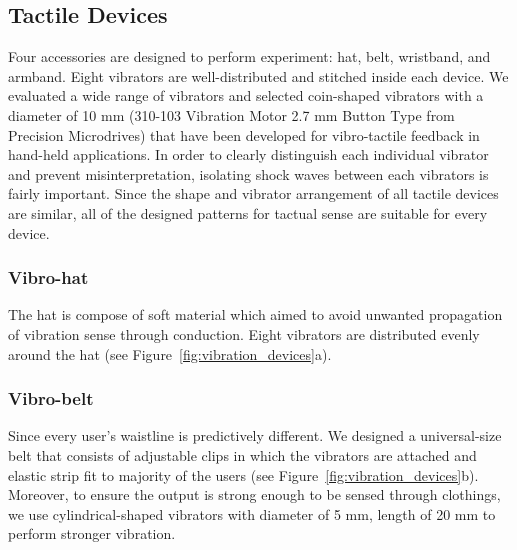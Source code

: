 \documentclass{sigchi}
\begin{document}
\subsection{Tactile Devices}
Four accessories are designed to perform experiment: hat, belt, wristband, and armband. Eight vibrators are well-distributed and stitched inside each device. We evaluated a wide range of vibrators and selected coin-shaped vibrators with a diameter of 10 mm (310-103 Vibration Motor 2.7 mm Button Type from Precision Microdrives) that have been developed for vibro-tactile feedback in hand-held applications. In order to clearly distinguish each individual vibrator and prevent misinterpretation, isolating shock waves between each vibrators is fairly important. Since the shape and vibrator arrangement of all tactile devices are similar, all of the designed patterns for tactual sense are suitable for every device. 


%
%

\subsubsection{Vibro-hat}
The hat is compose of soft material which aimed to avoid unwanted propagation of vibration sense through conduction. Eight vibrators are distributed evenly around the hat (see Figure~\ref{fig:vibration_devices}a).

\subsubsection{Vibro-belt}
Since every user's waistline is predictively different. We designed a universal-size belt that consists of adjustable clips in which the vibrators are attached and elastic strip fit to majority of the users (see Figure~\ref{fig:vibration_devices}b). Moreover, to ensure the output is strong enough to be sensed through clothings, we use cylindrical-shaped vibrators with diameter of 5 mm, length of 20 mm to perform stronger vibration.
\end{document}
